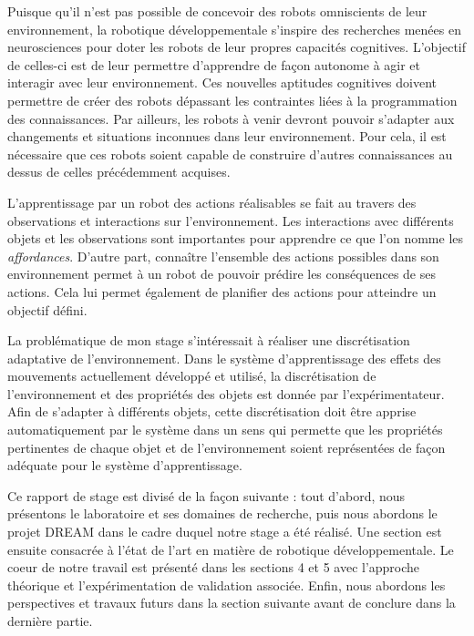 \documentclass[draft]{llncs}
\begin{document}
Puisque qu'il n'est pas possible de concevoir des robots omniscients de leur environnement, la robotique développementale s'inspire des recherches menées en neurosciences pour doter les robots de leur propres capacités cognitives.
L'objectif de celles-ci est de leur permettre d'apprendre de façon autonome à agir et interagir avec leur environnement.
Ces nouvelles aptitudes cognitives doivent permettre de créer des robots dépassant les contraintes liées à la programmation des connaissances.
Par ailleurs, les robots à venir devront pouvoir s'adapter aux changements et situations inconnues dans leur environnement.
Pour cela, il est nécessaire que ces robots soient capable de construire d'autres connaissances au dessus de celles précédemment acquises.

L'apprentissage par un robot des actions réalisables se fait au travers des observations et interactions sur l'environnement.
Les interactions avec différents objets et les observations sont importantes pour apprendre ce que l'on nomme les \textit{affordances}.
D'autre part, connaître l'ensemble des actions possibles dans son environnement permet à un robot de pouvoir prédire les conséquences de ses actions.
Cela lui permet également de planifier des actions pour atteindre un objectif défini.

La problématique de mon stage s'intéressait à réaliser une discrétisation adaptative de l'environnement.
Dans le système d'apprentissage des effets des mouvements actuellement développé et utilisé, la discrétisation de l'environnement et des propriétés des objets est donnée par l'expérimentateur.
Afin de s'adapter à différents objets, cette discrétisation doit être apprise automatiquement par le système dans un sens qui permette que les propriétés pertinentes de chaque objet et de l'environnement soient représentées de façon adéquate pour le système d'apprentissage.

Ce rapport de stage est divisé de la façon suivante : tout d'abord, nous présentons le laboratoire et ses domaines de recherche, puis nous abordons le projet DREAM dans le cadre duquel notre stage a été réalisé.
Une section est ensuite consacrée à l'état de l'art en matière de robotique développementale.
Le coeur de notre travail est présenté dans les sections 4 et 5 avec l'approche théorique et l'expérimentation de validation associée.
Enfin, nous abordons les perspectives et travaux futurs dans la section suivante avant de conclure dans la dernière partie.
\end{document}
